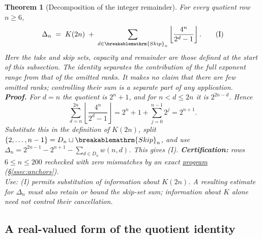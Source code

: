 \documentclass[11pt]{article}
\theoremstyle{plain}
\newtheorem{thm}{Theorem}[section]
\theoremstyle{definition}
\theoremstyle{remark}
\renewcommand{\mathrm}[1]{\ifmmode\breakablemathrm{#1}\else\textrm{#1}\fi}%
\begin{document}
\begin{thm}[Decomposition of the integer remainder]
\label{thm:master-identity}
For every quotient row $n \ge 6$,
\begin{equation*}
\Delta_n \;=\; K(2n) \;+\; \sum_{d \in \mathrm{Skip}_n} \left\lfloor \frac{4^n}{2^d-1} \right\rfloor.
\tag{I}
\end{equation*}
Here the take and skip sets, capacity and remainder are those defined
at the start of this subsection.  The identity separates the contribution
of the full exponent range from that of the omitted ranks.  It makes no
claim that there are few omitted ranks; controlling their sum is a
separate part of any application.\\
\textbf{Proof.} For $d=n$ the quotient is $2^n+1$, and for
$n<d\le2n$ it is $2^{2n-d}$.  Hence
\[
 \sum_{d=n}^{2n}\left\lfloor\frac{4^n}{2^d-1}\right\rfloor
 =2^n+1+\sum_{j=0}^{n-1}2^j=2^{n+1}.
\]
Substitute this in the definition of $K(2n)$, split
$\{2,\ldots,n-1\}=D_n\sqcup\mathrm{Skip}_n$, and use
$\Delta_n=2^{2n-1}-2^{n+1}-\sum_{d\in D_n}w(n,d)$.
This gives (I).  \textbf{Certification:} rows $6\le n\le200$
rechecked with zero mismatches by an exact
\href{https://github.com/wcook04/plectis-erdos/blob/f757115e03bebe5c04431a147da559015c680a37/research/experiments/erdos257/check_master_identity.py}{program}
(\S\ref{ssec:anchors}).\\
\textit{Use:} (I) permits substitution of information about $K(2n)$.
A resulting estimate for $\Delta_n$ must also retain or bound the
skip-set sum; information about $K$ alone need not control their
cancellation.
\end{thm}

\subsection{A real-valued form of the quotient identity}
\end{document}
